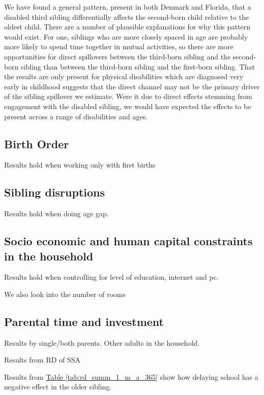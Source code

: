 We have found a general pattern, present in both Denmark and Florida, that a disabled third sibling differentially affects the second-born child relative to the oldest child. There are a number of plausible explanations for why this pattern would exist. For one, siblings who are more closely spaced in age are probably more likely to spend time together in mutual activities, so there are more opportunities for direct spillovers between the third-born sibling and the second-born sibling than between the third-born sibling and the first-born sibling. That the results are only present for physical disabilities which are diagnosed very early in childhood suggests that the direct channel may not be the primary driver of the sibling spillover we estimate. Were it due to direct effects stemming from engagement with the disabled sibling, we would have expected the effects to be present across a range of disabilities and ages.

\subsection{Birth Order}

Results hold when working only with first births

\subsection{Sibling disruptions}

Results hold when doing age gap.

\subsection{Socio economic and human capital constraints in the household}

Results hold when controlling for level of education, internet and pc.

We also look into the number of rooms\

\subsection{Parental time and investment}

Results by single/both parents. Other adults in the household.

Results from RD of SSA

Results from \hyperref[tab:rd_summ_1_m_a_365]{Table \ref{tab:rd_summ_1_m_a_365}} show how delaying school has a negative effect in the older sibling. 

